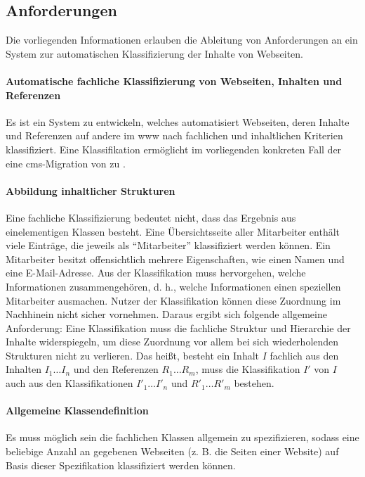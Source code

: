     \subsection{Anforderungen}
        \label{section:requirements}
        Die vorliegenden Informationen erlauben
        die Ableitung von Anforderungen an ein System
        zur automatischen Klassifizierung der Inhalte von Webseiten.

        \paragraph*{Automatische fachliche Klassifizierung von Webseiten, Inhalten und Referenzen}
        Es ist ein System zu entwickeln, welches automatisiert Webseiten,
        deren Inhalte und Referenzen auf andere {\resources} im \gls{www}
        nach fachlichen und inhaltlichen Kriterien klassifiziert.
        Eine Klassifikation ermöglicht im vorliegenden konkreten Fall
        der {\fernUni} eine \gls{cms}-Migration von {\wordpress} zu {\imperia}.

        \paragraph*{Abbildung inhaltlicher Strukturen}
        Eine fachliche Klassifizierung bedeutet nicht,
        dass das Ergebnis aus einelementigen Klassen besteht.
        Eine Übersichtsseite aller Mitarbeiter enthält viele Einträge,
        die jeweils als "`Mitarbeiter"' klassifiziert werden können.
        Ein Mitarbeiter besitzt offensichtlich mehrere Eigenschaften,
        wie einen Namen und eine E-Mail-Adresse.
        Aus der Klassifikation muss hervorgehen,
        welche Informationen zusammengehören,
        d. h., welche Informationen einen speziellen Mitarbeiter ausmachen.
        Nutzer der Klassifikation können diese Zuordnung im Nachhinein nicht sicher vornehmen.
        Daraus ergibt sich folgende allgemeine Anforderung:
        Eine Klassifikation muss die fachliche Struktur
        und Hierarchie der Inhalte widerspiegeln,
        um diese Zuordnung vor allem bei sich wiederholenden Strukturen
        nicht zu verlieren.
        Das heißt, besteht ein Inhalt $I$ fachlich aus den Inhalten $I_1 \ldots I_n$
        und den Referenzen $R_1 \ldots R_m$,
        muss die Klassifikation $I'$ von $I$ auch aus den Klassifikationen
        $I'_1 \ldots I'_n$ und $R'_1 \ldots R'_m$ bestehen.

        \paragraph*{Allgemeine Klassendefinition}
        Es muss möglich sein die fachlichen Klassen allgemein zu
        spezifizieren, sodass eine beliebige Anzahl an gegebenen
        Webseiten (z. B. die Seiten einer Website)
        auf Basis dieser Spezifikation klassifiziert werden können.

